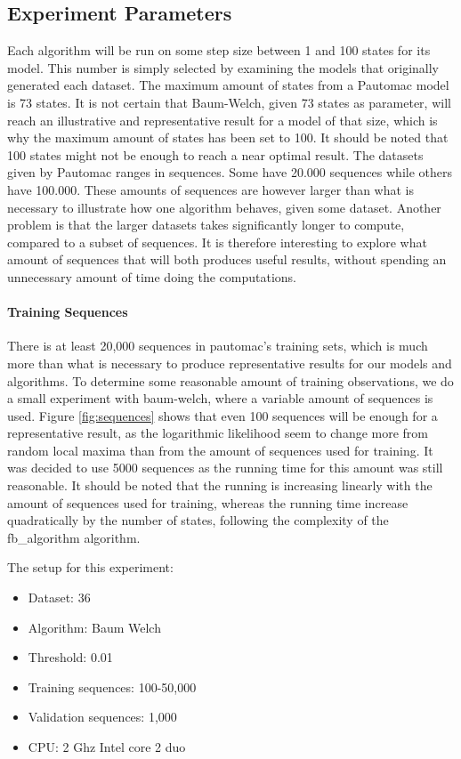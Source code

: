 \subsection{Experiment Parameters}
Each algorithm will be run on some step size between 1 and 100 states for its model. This number is simply selected by examining the models that originally generated each dataset. The maximum amount of states from a Pautomac model is 73 states. It is not certain that Baum-Welch, given 73 states as parameter, will reach an illustrative and representative result for a model of that size, which is why the maximum amount of states has been set to 100. It should be noted that 100 states might not be enough to reach a near optimal result.
The datasets given by Pautomac ranges in sequences. Some have 20.000 sequences while others have 100.000. These amounts of sequences are however larger than what is necessary to illustrate how one algorithm behaves, given some dataset. Another problem is that the larger datasets takes significantly longer to compute, compared to a subset of sequences. It is therefore interesting to explore what amount of sequences that will both produces useful results, without spending an unnecessary amount of time doing the computations.

\paragraph{Training Sequences}
There is at least 20,000 sequences in pautomac's training sets, which is much more than what is necessary to produce representative results for our models and algorithms. To determine some reasonable amount of training observations, we do a small experiment with \gls{baum-welch}, where a variable amount of sequences is used. Figure \ref{fig:sequences} shows that even 100 sequences will be enough for a representative result, as the logarithmic likelihood seem to change more from random local maxima than from the amount of sequences used for training. It was decided to use 5000 sequences as the running time for this amount was still reasonable. It should be noted that the running is increasing linearly with the amount of sequences used for training, whereas the running time increase quadratically by the number of states, following the complexity of the \gls{fb_algorithm} algorithm.

The setup for this experiment:
\begin{itemize}
\item Dataset: 36
\item Algorithm: Baum Welch
\item Threshold: 0.01
\item Training sequences: 100-50,000
\item Validation sequences: 1,000
\item CPU: 2 Ghz Intel core 2 duo
\end{itemize}

